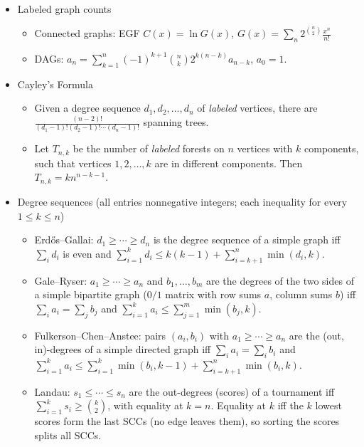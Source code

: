 \begin{itemize}
\item Labeled graph counts

\begin{itemize}
  \item Connected graphs: EGF $C(x) = \ln G(x)$, $G(x) = \sum_n 2^{\binom n 2} \frac{x^n}{n!}$
  \item DAGs: $a_n = \sum_{k=1}^{n} (-1)^{k+1} \binom nk 2^{k(n-k)} a_{n-k}$, $a_0 = 1$.
\end{itemize}

\item Cayley's Formula

\begin{itemize}
  \item Given a degree sequence $d_1, d_2, \ldots, d_n$ of \textit{labeled} vertices, there are $\frac{(n - 2)!}{(d_1 - 1)!(d_2 - 1)!\cdots(d_n - 1)!}$ spanning trees.
  \item Let $T_{n, k}$ be the number of \textit{labeled} forests on $n$ vertices with $k$ components, such that vertices $1, 2, \ldots, k$ are in different components. Then $T_{n, k} = kn^{n - k - 1}$.
\end{itemize}

\item Degree sequences (all entries nonnegative integers; each inequality for every $1 \le k \le n$)
\begin{itemize}
  \item Erdős–Gallai: $d_1 \ge \cdots \ge d_n$ is the degree sequence of a simple graph iff $\sum_i d_i$ is even and $\displaystyle\sum_{i=1}^k d_i \le k(k-1) + \displaystyle\sum_{i=k+1}^n \min(d_i, k)$.
  \item Gale–Ryser: $a_1 \ge \cdots \ge a_n$ and $b_1, \ldots, b_m$ are the degrees of the two sides of a simple bipartite graph ($0/1$ matrix with row sums $a$, column sums $b$) iff $\sum_i a_i = \sum_j b_j$ and $\displaystyle\sum_{i=1}^k a_i \le \displaystyle\sum_{j=1}^m \min(b_j, k)$.
  \item Fulkerson–Chen–Anstee: pairs $(a_i, b_i)$ with $a_1 \ge \cdots \ge a_n$ are the (out, in)-degrees of a simple directed graph iff $\sum_i a_i = \sum_i b_i$ and $\displaystyle\sum_{i=1}^k a_i \le \displaystyle\sum_{i=1}^k \min(b_i, k-1) + \displaystyle\sum_{i=k+1}^n \min(b_i, k)$.
  \item Landau: $s_1 \le \cdots \le s_n$ are the out-degrees (scores) of a tournament iff $\displaystyle\sum_{i=1}^k s_i \ge \binom{k}{2}$, with equality at $k = n$. Equality at $k$ iff the $k$ lowest scores form the last SCCs (no edge leaves them), so sorting the scores splits all SCCs.
\end{itemize}


\end{itemize}
